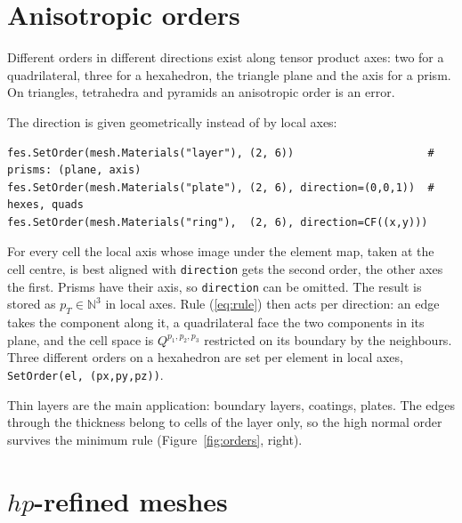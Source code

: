 \documentclass[10pt,a4paper]{article}
\newcommand{\code}[1]{\texttt{#1}}
\begin{document}
\section{Anisotropic orders}

Different orders in different directions exist along tensor product axes: two for a quadrilateral, three for a hexahedron, the triangle plane and the axis for a prism. On triangles, tetrahedra and pyramids an anisotropic order is an error.

The direction is given geometrically instead of by local axes:
\begin{lstlisting}
fes.SetOrder(mesh.Materials("layer"), (2, 6))                     # prisms: (plane, axis)
fes.SetOrder(mesh.Materials("plate"), (2, 6), direction=(0,0,1))  # hexes, quads
fes.SetOrder(mesh.Materials("ring"),  (2, 6), direction=CF((x,y)))
\end{lstlisting}
For every cell the local axis whose image under the element map, taken at the cell centre, is best aligned with \code{direction} gets the second order, the other axes the first. Prisms have their axis, so \code{direction} can be omitted. The result is stored as $p_T \in \mathbb{N}^3$ in local axes. Rule (\ref{eq:rule}) then acts per direction: an edge takes the component along it, a quadrilateral face the two components in its plane, and the cell space is $Q^{p_1,p_2,p_3}$ restricted on its boundary by the neighbours. Three different orders on a hexahedron are set per element in local axes, \code{SetOrder(el, (px,py,pz))}.

Thin layers are the main application: boundary layers, coatings, plates. The edges through the thickness belong to cells of the layer only, so the high normal order survives the minimum rule (Figure~\ref{fig:orders}, right).

\section{$hp$-refined meshes}
\end{document}

